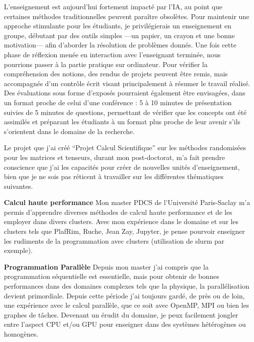 L'enseignement est aujourd'hui fortement impacté par l'IA, au point que
certaines méthodes traditionnelles peuvent paraître obsolètes. Pour maintenir
une approche stimulante pour les étudiants, je privilégierais un enseignement
en groupe, débutant par des outils simples ---un papier, un crayon et une bonne
motivation--- afin d'aborder la résolution de problèmes donnés. Une fois cette
phase de réflexion menée en interaction avec l'enseignant terminée, nous
pourrions passer à la partie pratique sur ordinateur. Pour vérifier la
compréhension des notions, des rendus de projets peuvent être remis, mais
accompagnés d'un contrôle écrit visant principalement à résumer le travail
réalisé. Des évaluations sous forme d'exposés pourraient également être
envisagées, dans un format proche de celui d'une conférence : 5 à 10 minutes de
présentation suivies de 5 minutes de questions, permettant de vérifier que les
concepts ont été assimilés et préparant les étudiants à un format plus proche
de leur avenir s'ils s'orientent dans le domaine de la recherche.

Le projet que j'ai créé ``Projet Calcul Scientifique'' sur les méthodes
randomisées pour les matrices et tenseurs, durant mon post-doctorat, m'a fait
prendre conscience que j'ai les capacités pour créer de nouvelles unités
d'enseignement, bien que je ne sois pas réticent à travailler sur les
différentes thématiques suivantes.

\begin{flushleft}
\textbf{Calcul haute performance} Mon master PDCS de l'Université Paris-Saclay m'a permis d'apprendre diverses méthodes de calcul haute performance et de les employer dans divers clusters. Avec mon expérience dans le domaine et sur les clusters tels que PlafRim, Ruche, Jean Zay, Jupyter, je pense pourvoir enseigner les rudiments de la programmation avec clusters (utilisation de slurm par exemple).
\end{flushleft}

\begin{flushleft}
\textbf{Programmation Parallèle} Depuis mon master j'ai compris que la programmation séquentielle est essentielle, mais pour obtenir de bonnes performances dans des domaines complexes tels que la physique, la parallélisation devient primordiale. Depuis cette période j'ai toujours gardé, de près ou de loin, une expérience avec le calcul parallèle, que ce soit avec OpenMP, MPI ou bien les graphes de tâches. Devenant un érudit du domaine, je peux facilement jongler entre l'aspect CPU et/ou GPU pour enseigner dans des systèmes hétérogènes ou homogènes.
\end{flushleft}

